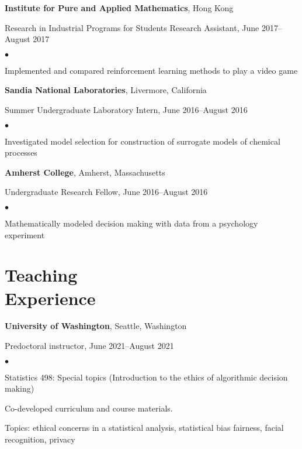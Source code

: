 \documentclass[margin,centered]{res}
\newenvironment{list1}{
  \begin{list}{\ding{113}}{%
      \setlength{\itemsep}{0in}
      \setlength{\parsep}{0in} \setlength{\parskip}{0in}
      \setlength{\topsep}{0in} \setlength{\partopsep}{0in}
      \setlength{\leftmargin}{0.17in}}}{\end{list}}
\newenvironment{list2}{
  \begin{list}{$\bullet$}{%
      \setlength{\itemsep}{0in}
      \setlength{\parsep}{0in} \setlength{\parskip}{0in}
      \setlength{\topsep}{0in} \setlength{\partopsep}{0in}
      \setlength{\leftmargin}{0.2in}}}{\end{list}}
\begin{document}
\begin{resume}
{\bf Institute for Pure and Applied Mathematics}, Hong Kong
\begin{list1}
\item[] 
Research in Industrial Programs for Students Research Assistant, June 2017--August 2017
\begin{list2}
\vspace*{.05in}
\item
Implemented and compared reinforcement learning methods to play a video game
\end{list2} 
\end{list1}

{\bf Sandia National Laboratories}, Livermore, California
\begin{list1}
\item[] 
Summer Undergraduate Laboratory Intern, June 2016--August 2016
\begin{list2}
\vspace*{.05in}
\item
Investigated model selection for construction of surrogate models of chemical processes
\end{list2} 
\end{list1}

{\bf Amherst College}, Amherst, Massachusetts 
\begin{list1}
\item[] 
Undergraduate Research Fellow, June 2016--August 2016
\begin{list2}
\vspace*{.05in}
\item
Mathematically modeled decision making with data from a psychology experiment
\end{list2} 
\end{list1}


\section{\sc Teaching \\ Experience}

{\bf University of Washington}, Seattle, Washington
\begin{list1}
\item[] Predoctoral instructor, June 2021--August 2021
\begin{list2}
\vspace*{.05in}
\item Statistics 498: Special topics (Introduction to the ethics of algorithmic decision making)
\item Co-developed curriculum and course materials. 
\item Topics: ethical concerns in a statistical analysis, statistical bias fairness, facial recognition, privacy
\end{list2}
\end{list1}


\end{resume}
\end{document}
